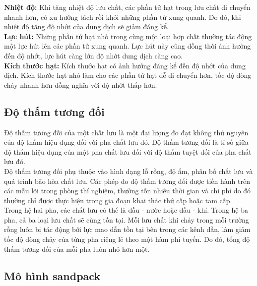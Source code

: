 \documentclass[12pt,a4paper]{article}
\begin{document}
	\noindent
	\textbf{Nhiệt độ:} Khi tăng nhiệt độ lưu chất, các phần tử hạt trong lưu chất di chuyển nhanh hơn, có xu hướng tách rồi khỏi những phần tử xung quanh. Do đó, khi nhiệt độ tăng độ nhớt của dung dịch sẽ giảm đáng kể.\\
	\textbf{Lực hút:} Những phần tử hạt nhỏ trong cùng một loại hợp chất thường tác động một lực hút lên các phần tử xung quanh. Lực hút này cũng đồng thời ảnh hưởng đến độ nhớt, lực hút càng lớn độ nhớt dung dịch càng cao.\\
	\textbf{Kích thước hạt:} Kích thước hạt có ảnh hưởng đáng kể đến độ nhớt của dung dịch. Kích thước hạt nhỏ làm cho các phần tử hạt dễ di chuyển hơn, tốc độ dòng chảy nhanh hơn đồng nghĩa với độ nhớt thấp hơn.
	\subsection{Độ thấm tương đối}
	Độ thấm tương đối của một chất lưu là một đại lượng đo đạt không thứ nguyên của độ thấm hiệu dụng đối với pha chất lưu đó. Độ thấm tương đối là tỉ số giữa độ thấm hiệu dụng của một pha chất lưu đối với độ thấm tuyệt đối của pha chất lưu đó.\\
	Độ thấm tương đối phụ thuộc vào hình dạng lỗ rỗng, độ ẩm, phân bố chất lưu và quá trình bão hòa chất lưu. Các phép đo độ thấm tương đối được tiến hành trên các mẫu lõi trong phòng thí nghiệm, thường tốn nhiều thời gian và chi phí do đó thường chỉ được thực hiện trong gia đoạn khai thác thứ cấp hoặc tam cấp.\\
	Trong hệ hai pha, các chất lưu có thể là dầu - nước hoặc dầu - khí. Trong hệ ba pha, cả ba loại lưu chất sẽ cùng tồn tại. Mỗi lưu chất khi chảy trong mỗi trường rỗng luôn bị tác động bởi lực mao dẫn tồn tại bên trong các kênh dẫn, làm giảm tốc độ dòng chảy của từng pha riêng lẻ theo một hàm phi tuyến. Do đó, tổng độ thấm tương đối của mỗi pha luôn nhỏ hơn một.
	\subsection{Mô hình sandpack}
\end{document}
